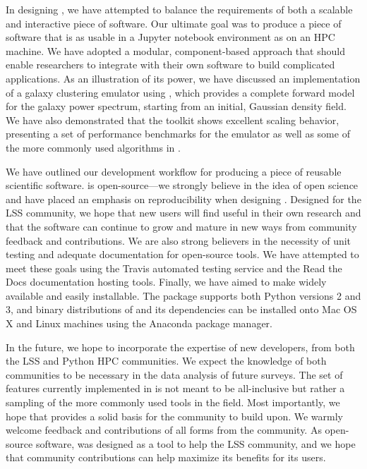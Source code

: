 In designing \nbkit{}, we have attempted to balance the requirements
of both a scalable and interactive piece of software.
Our ultimate goal was to produce a piece of software that is as usable
in a Jupyter notebook environment as on an HPC machine.
We have adopted a modular, component-based approach that should enable
researchers to integrate \nbkit{} with their own software to build
complicated applications. As an illustration of its power, we have discussed an
implementation of a galaxy clustering emulator using \nbkit{},
which provides a complete forward model for the galaxy power spectrum,
starting from an initial, Gaussian density field.
We have also demonstrated that the toolkit shows excellent scaling behavior,
presenting a set of performance benchmarks for the
emulator as well as some of the more commonly used algorithms in
\nbkit{}.

We have outlined our development workflow for producing
a piece of reusable scientific software. \nbkit{} is open-source---we
strongly believe in the idea of open science and have placed an emphasis on
reproducibility when designing \nbkit{}. Designed for the LSS community,
we hope that new users will find \nbkit{}  useful in their own research
and that the software can continue to grow and mature in new ways from
community feedback and contributions. We are also strong believers in
the necessity of unit testing and adequate documentation for open-source
tools. We have attempted to meet these goals using the Travis automated
testing service and the Read the Docs documentation hosting tools.
Finally, we have aimed to
make \nbkit{} widely available and easily installable. The package supports
both Python versions 2 and 3, and binary distributions of \nbkit{} and its
dependencies can be installed onto Mac OS X and Linux machines using the
Anaconda package manager.

In the future, we hope to incorporate the expertise of new developers,
from both the LSS and Python HPC communities. We expect
the knowledge of both communities to be necessary in the data analysis of
future surveys. The set of features currently implemented in \nbkit{}
is not meant to be all-inclusive but rather a sampling of the more commonly
used tools in the field. Most importantly, we hope that \nbkit{} provides
a solid basis for the community to build upon. We warmly welcome feedback and
contributions of all forms from the community.
As open-source software, \nbkit{}
was designed as a tool to help the LSS community, and we hope that community
contributions can help maximize its benefits for its users.



